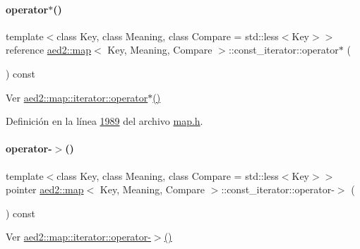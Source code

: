 \paragraph{\texorpdfstring{operator$\ast$()}{operator*()}}
{\footnotesize\ttfamily template$<$class Key, class Meaning, class Compare = std\+::less$<$\+Key$>$$>$ \\
reference \hyperlink{classaed2_1_1map}{aed2\+::map}$<$ Key, Meaning, Compare $>$\+::const\+\_\+iterator\+::operator$\ast$ (\begin{DoxyParamCaption}{ }\end{DoxyParamCaption}) const\hspace{0.3cm}{\ttfamily [inline]}}



Ver \hyperlink{classaed2_1_1map_1_1iterator_ab115711d0295146906830840590d900a_ab115711d0295146906830840590d900a}{aed2\+::map\+::iterator\+::operator$\ast$()} 



Definición en la línea \hyperlink{map_8h_source_l01989}{1989} del archivo \hyperlink{map_8h_source}{map.\+h}.

\mbox{\label{classaed2_1_1map_1_1const__iterator_a07700cccc763da67d42c84d20f4e1d1b_a07700cccc763da67d42c84d20f4e1d1b}} 
\paragraph{\texorpdfstring{operator-\/$>$()}{operator->()}}
{\footnotesize\ttfamily template$<$class Key, class Meaning, class Compare = std\+::less$<$\+Key$>$$>$ \\
pointer \hyperlink{classaed2_1_1map}{aed2\+::map}$<$ Key, Meaning, Compare $>$\+::const\+\_\+iterator\+::operator-\/$>$ (\begin{DoxyParamCaption}{ }\end{DoxyParamCaption}) const\hspace{0.3cm}{\ttfamily [inline]}}



Ver \hyperlink{classaed2_1_1map_1_1iterator_a712522d62f461c1eb9b02ecf248bae8c_a712522d62f461c1eb9b02ecf248bae8c}{aed2\+::map\+::iterator\+::operator-\/$>$()} 



